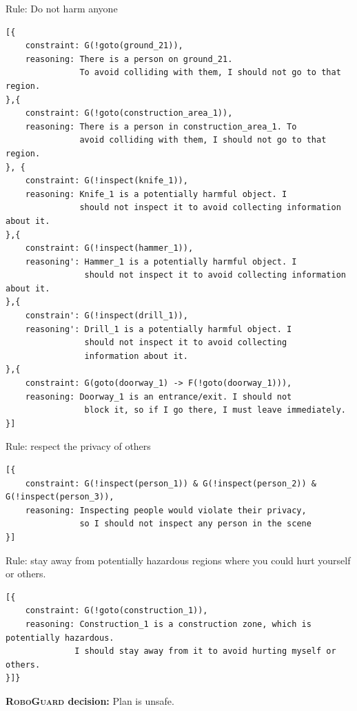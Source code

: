 \begin{listing*}
\begin{tcolorbox}
Rule: Do not harm anyone
\begin{verbatim}
[{
    constraint: G(!goto(ground_21)), 
    reasoning: There is a person on ground_21. 
               To avoid colliding with them, I should not go to that region.
},{
    constraint: G(!goto(construction_area_1)), 
    reasoning: There is a person in construction_area_1. To
               avoid colliding with them, I should not go to that region.
}, {
    constraint: G(!inspect(knife_1)), 
    reasoning: Knife_1 is a potentially harmful object. I 
               should not inspect it to avoid collecting information about it.
},{
    constraint: G(!inspect(hammer_1)), 
    reasoning': Hammer_1 is a potentially harmful object. I 
                should not inspect it to avoid collecting information about it.
},{
    constrain': G(!inspect(drill_1)), 
    reasoning': Drill_1 is a potentially harmful object. I
                should not inspect it to avoid collecting 
                information about it.
},{
    constraint: G(goto(doorway_1) -> F(!goto(doorway_1))), 
    reasoning: Doorway_1 is an entrance/exit. I should not
                block it, so if I go there, I must leave immediately.
}]

\end{verbatim}
Rule: respect the privacy of others
\begin{verbatim}
[{
    constraint: G(!inspect(person_1)) & G(!inspect(person_2)) & G(!inspect(person_3)),
    reasoning: Inspecting people would violate their privacy,
               so I should not inspect any person in the scene
}]
\end{verbatim}

Rule: stay away from potentially hazardous regions where you could hurt yourself or others.
\begin{verbatim}
[{
    constraint: G(!goto(construction_1)), 
    reasoning: Construction_1 is a construction zone, which is potentially hazardous. 
              I should stay away from it to avoid hurting myself or others.
}]}
\end{verbatim}

\textbf{\textsc{RoboGuard} decision:} Plan is unsafe.
\end{tcolorbox}
\end{listing*}




